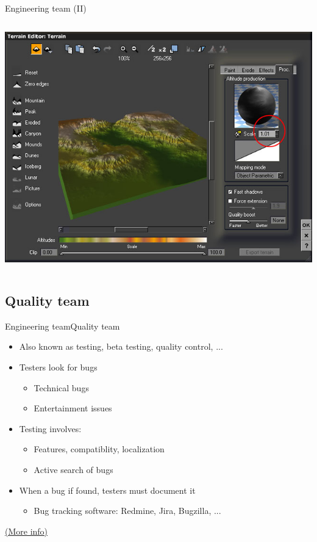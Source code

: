 \documentclass[10pt,compress]{beamer} %
\begin{document}
\begin{frame}[plain]{Engineering team (II)}
\begin{columns}
		\centering\includegraphics[width=\linewidth]{figs/geocontrol07}
		\end{columns}
\end{frame}

\subsection[Quality team]{Quality team}
\begin{frame}{Engineering team}{Quality team}
	\begin{itemize}
		\item Also known as testing, beta testing, quality control, ...
		\item Testers look for bugs
			\begin{itemize}
				\item Technical bugs
				\item Entertainment issues
			\end{itemize}
		\item Testing involves:
			\begin{itemize}
				\item Features, compatiblity, localization
				\item Active search of bugs
			\end{itemize}
		\item When a bug if found, testers must document it
			\begin{itemize}
				\item Bug tracking software: Redmine, Jira, Bugzilla, ...
			\end{itemize}
	\end{itemize}
	\href{http://en.wikipedia.org/wiki/Game\_testing}{(More info)}
\end{frame}
\end{document}
